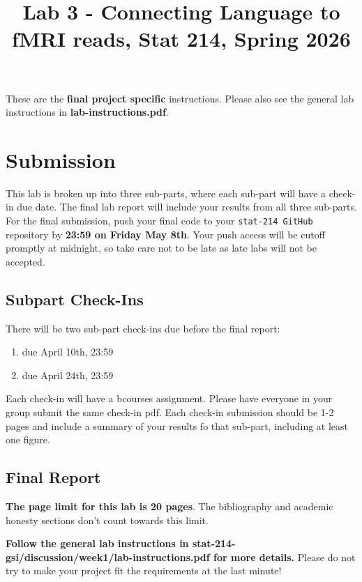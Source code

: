\documentclass[letterpaper,12pt]{article}
\title{Lab 3 - Connecting Language to fMRI reads, Stat 214, Spring 2026\vspace{-2em}}
\date{}
\begin{document}
\maketitle

These are the \textbf{final project specific} instructions. Please also see the general lab instructions in \textbf{lab-instructions.pdf}.

\tableofcontents

\clearpage
\section{Submission}

This lab is broken up into three sub-parts, where each sub-part will have a check-in due date. The final lab report will include your results from all three sub-parts. For the final submission, push your final code to your \texttt{stat-214 GitHub} repository by \textbf{23:59 on Friday May 8th}. Your push access will be cutoff promptly at midnight, so take care not to be late as late labs will not be accepted.

\subsection{Subpart Check-Ins}

There will be two sub-part check-ins due before the final report:
\begin{enumerate}
    \item [\textbf{3.1:}] due April 10th, 23:59
    \item [\textbf{3.2:}] due April 24th, 23:59
\end{enumerate}

Each check-in will have a bcourses assignment. Please have everyone in your group submit the same check-in pdf. Each check-in submission should be 1-2 pages and include a summary of your results fo that sub-part, including at least one figure.

\subsection{Final Report}
\textbf{The page limit for this lab is 20 pages}. The bibliography and academic honesty sections don't count towards this limit.

\textbf{Follow the general lab instructions in stat-214-gsi/discussion/week1/lab-instructions.pdf for more details.} Please do not try to make your project fit the requirements at the last minute!
\end{document}
